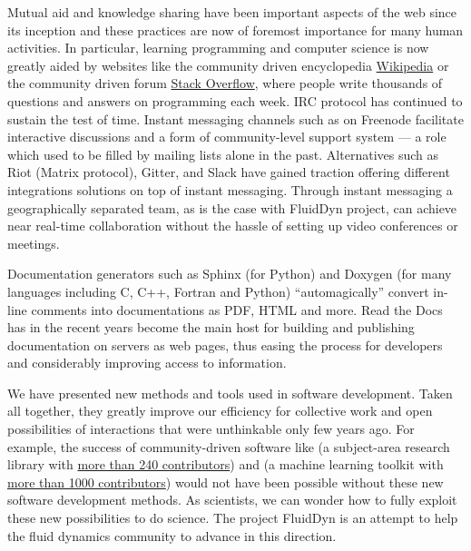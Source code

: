  Mutual aid and knowledge sharing
have been important aspects of the web since its inception and these practices
are now of foremost importance for many human activities.
%
In particular, learning programming and computer science is now greatly aided
by websites like the community driven encyclopedia
\href{https://www.wikipedia.org/}{Wikipedia} or the community driven forum
\href{https://stackoverflow.com/}{Stack Overflow}, where people write thousands
of questions and answers on programming each week.
IRC protocol has continued to sustain the test of time. Instant messaging
channels such as  on Freenode facilitate interactive
discussions and a form of community-level support system --- a role which used
to be filled by mailing lists alone in the past. Alternatives such as Riot
(Matrix protocol), Gitter, and Slack have gained traction offering different
integrations solutions on top of instant messaging.
%
Through instant messaging a geographically separated team, as is the case with
FluidDyn project, can achieve near real-time collaboration without the hassle
of setting up video conferences or meetings.

 Documentation
generators such as Sphinx (for Python) and Doxygen (for many languages
including C, C++, Fortran and Python) ``automagically'' convert in-line
comments into documentations as PDF, HTML and more. Read the Docs has in the
recent years become the main host for building and publishing documentation on
servers as web pages, thus easing the process for developers and considerably
improving access to information.


We have presented new methods and tools used in software development.  Taken
all together, they greatly improve our efficiency for collective work and open
possibilities of interactions that were unthinkable only few years ago.
%
For example, the success of community-driven software like  (a
subject-area research library with \href{https://github.com/astropy/astropy}{more
than 240 contributors}) and  (a machine learning toolkit with
\href{https://github.com/scikit-learn/scikit-learn}{more than 1000 contributors})
would not have been possible without these new software development methods.
%
%
As scientists, we can wonder how to fully exploit these new possibilities to do
science.  The project FluidDyn is an attempt to help the fluid dynamics community
to advance in this direction.



